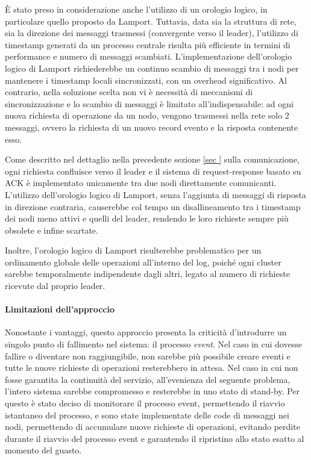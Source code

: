 \documentclass[12pt, a4paper]{report}
\begin{document}
\`E stato preso in considerazione anche l'utilizzo di un orologio logico, in particolare quello proposto da Lamport. Tuttavia, data sia la struttura di rete, sia la direzione dei messaggi trasmessi (convergente verso il leader), l'utilizzo di timestamp generati da un processo centrale risulta pi\`u efficiente in termini di performance e numero di messaggi scambiati. L'implementazione dell'orologio logico di Lamport richiederebbe un continuo scambio di messaggi tra i nodi per mantenere i timestamp locali sincronizzati, con un overhead significativo. Al contrario, nella soluzione scelta non vi \`e necessit\`a di meccanismi di sincronizzazione e lo scambio di messaggi \`e limitato all'indispensabile: ad ogni nuova richiesta di operazione da un nodo, vengono trasmessi nella rete solo 2 messaggi, ovvero la richiesta di un nuovo record evento e la risposta contenente esso.

Come descritto nel dettaglio nella precedente sezione \ref{sec
} sulla comunicazione, ogni richiesta confluisce verso il leader e il sistema di request-response basato su ACK \`e implementato unicamente tra due nodi direttamente comunicanti. L'utilizzo dell'orologio logico di Lamport, senza l'aggiunta di messaggi di risposta in direzione contraria, causerebbe col tempo un disallineamento tra i timestamp dei nodi meno attivi e quelli del leader, rendendo le loro richieste sempre pi\`u obsolete e infine scartate.

Inoltre, l'orologio logico di Lamport risulterebbe problematico per un ordinamento globale delle operazioni all'interno del log, poiché ogni cluster sarebbe temporalmente indipendente dagli altri, legato al numero di richieste ricevute dal proprio leader.

\paragraph{Limitazioni dell'approccio}

Nonostante i vantaggi, questo approccio presenta la criticit\`a d'introdurre un singolo punto di fallimento nel sistema: il processo \textit{event}. Nel caso in cui dovesse fallire o diventare non raggiungibile, non sarebbe pi\`u possibile creare eventi e tutte le nuove richieste di operazioni resterebbero in attesa. Nel caso in cui non fosse garantita la continuit\`a del servizio, all'evenienza del seguente problema, l'intero sistema sarebbe compromesso e resterebbe in uno stato di stand-by. Per questo \`e stato deciso di monitorare il processo event, permettendo il riavvio istantaneo del processo, e sono state implementate delle code di messaggi nei nodi, permettendo di accumulare nuove richieste di operazioni, evitando perdite durante il riavvio del processo event e garantendo il ripristino allo stato esatto al momento del guasto.
\end{document}
